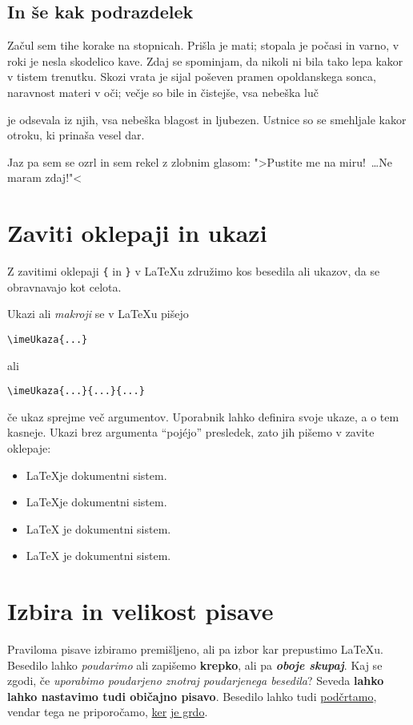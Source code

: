 \documentclass[a4paper]{article}
\begin{document}
\subsection{In še kak podrazdelek}

Začul sem tihe korake na stopnicah. Prišla je mati; stopala je počasi in varno, v roki je
nesla skodelico kave. Zdaj se spominjam, da nikoli ni bila tako lepa kakor v tistem
trenutku. Skozi vrata je sijal poševen pramen opoldanskega sonca, naravnost materi v oči;
večje so bile in čistejše, vsa nebeška luč 

je odsevala iz njih, vsa nebeška blagost in
ljubezen. Ustnice so se smehljale kakor otroku, ki prinaša vesel dar.

Jaz pa sem se ozrl in sem rekel z zlobnim glasom: ">Pustite me na miru!~\dots Ne maram zdaj!"<

\section{Zaviti oklepaji in ukazi}

Z zavitimi oklepaji \texttt{\{} in \texttt{\}} v LaTeXu združimo kos besedila ali ukazov,
da se obravnavajo kot celota.

Ukazi ali \emph{makroji} se v LaTeXu pišejo
%
\begin{center}
  \verb|\imeUkaza{...}|
\end{center}
%
ali
%
\begin{center}
  \verb|\imeUkaza{...}{...}{...}|
\end{center}
%
če ukaz sprejme več argumentov. Uporabnik lahko definira svoje ukaze, a o tem kasneje.
Ukazi brez argumenta ``pojéjo'' presledek, zato jih pišemo v zavite oklepaje:
%
\begin{itemize}
\item \LaTeX je dokumentni sistem.
\item \LaTeX         je dokumentni sistem.
\item \LaTeX{} je dokumentni sistem.
\item {\LaTeX} je dokumentni sistem.
\end{itemize}


\section{Izbira in velikost pisave}

Praviloma pisave izbiramo premišljeno, ali pa izbor kar prepustimo LaTeXu.
Besedilo lahko \emph{poudarimo} ali zapišemo \textbf{krepko}, ali pa \emph{\textbf{oboje skupaj}}.
Kaj se zgodi, če \emph{uporabimo poudarjeno \emph{znotraj} poudarjenega besedila}?
Seveda \textbf{lahko lahko nastavimo tudi \textnormal{običajno} pisavo}.
Besedilo lahko tudi \underline{podčrtamo}, vendar tega ne priporočamo, \underline{ker} \underline{je grdo}.
\end{document}
